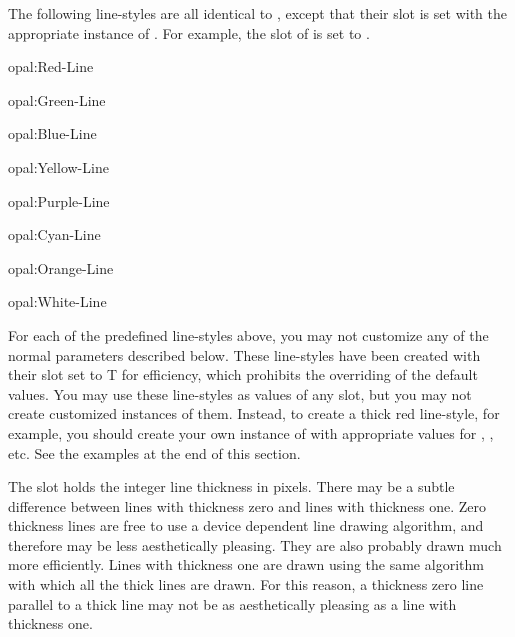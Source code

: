 \begin{group}
The following line-styles are all identical to ,
except that their  slot is set with the appropriate
instance of .  For example, the  slot
of  is set to .

\vspace{.5 line}
\begin{text}
opal:Red-Line

opal:Green-Line

opal:Blue-Line

opal:Yellow-Line

opal:Purple-Line

opal:Cyan-Line

opal:Orange-Line

opal:White-Line
\end{text}
\end{group}
\vspace{.5 line}

For each of the predefined line-styles above, you may not customize
any of the normal parameters described below.  These line-styles have
been created with their  slot set to T for
efficiency, which prohibits the overriding of the default values.
You may use these line-styles as values of any  slot,
but you may not create customized instances of them.  Instead, to create
a thick red line-style, for example, you should create your own
instance of  with appropriate values for
, , etc.  See the examples at
the end of this section.

\vspace{1 line}
\begin{group}
The  slot holds the integer line thickness in pixels.
There may be a subtle difference between lines with thickness zero and
lines with thickness one.  Zero thickness lines are free to use a device
dependent line drawing algorithm, and therefore may be less aesthetically
pleasing.  They are also probably drawn much more efficiently.  Lines with
thickness one are drawn using the same algorithm with which all the thick lines
are drawn.  For this reason, a thickness zero line parallel to a thick line
may not be as aesthetically pleasing as a line with thickness one.
\end{group}
\vspace{1 line}


